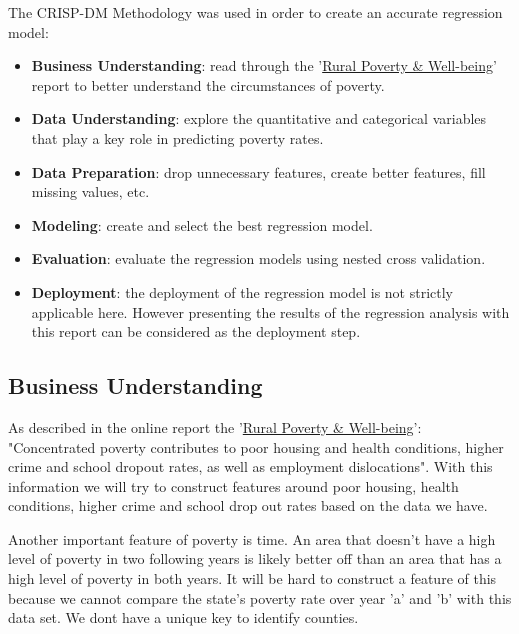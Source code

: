 \documentclass[11pt]{article}
\providecommand{\tightlist}{%
      \setlength{\itemsep}{0pt}\setlength{\parskip}{0pt}}
\begin{document}
The CRISP-DM Methodology was used in order to create an accurate
regression model:

\begin{itemize}
\tightlist
\item
  \textbf{Business Understanding}: read through the
  '\href{https://www.ers.usda.gov/topics/rural-economy-population/rural-poverty-well-being/poverty-overview.aspx}{Rural
  Poverty \& Well-being}' report to better understand the circumstances
  of poverty.
\item
  \textbf{Data Understanding}: explore the quantitative and categorical
  variables that play a key role in predicting poverty rates.
\item
  \textbf{Data Preparation}: drop unnecessary features, create better
  features, fill missing values, etc.
\item
  \textbf{Modeling}: create and select the best regression model.
\item
  \textbf{Evaluation}: evaluate the regression models using nested cross
  validation.
\item
  \textbf{Deployment}: the deployment of the regression model is not
  strictly applicable here. However presenting the results of the
  regression analysis with this report can be considered as the
  deployment step.
\end{itemize}

\subsection{Business Understanding}\label{business-understanding}

As described in the online report the
'\href{https://www.ers.usda.gov/topics/rural-economy-population/rural-poverty-well-being/poverty-overview.aspx}{Rural
Poverty \& Well-being}': "Concentrated poverty contributes to poor
housing and health conditions, higher crime and school dropout rates, as
well as employment dislocations". With this information we will try to
construct features around poor housing, health conditions, higher crime
and school drop out rates based on the data we have.

Another important feature of poverty is time. An area that doesn't have
a high level of poverty in two following years is likely better off than
an area that has a high level of poverty in both years. It will be hard
to construct a feature of this because we cannot compare the state's
poverty rate over year 'a' and 'b' with this data set. We dont have a
unique key to identify counties.
\end{document}
